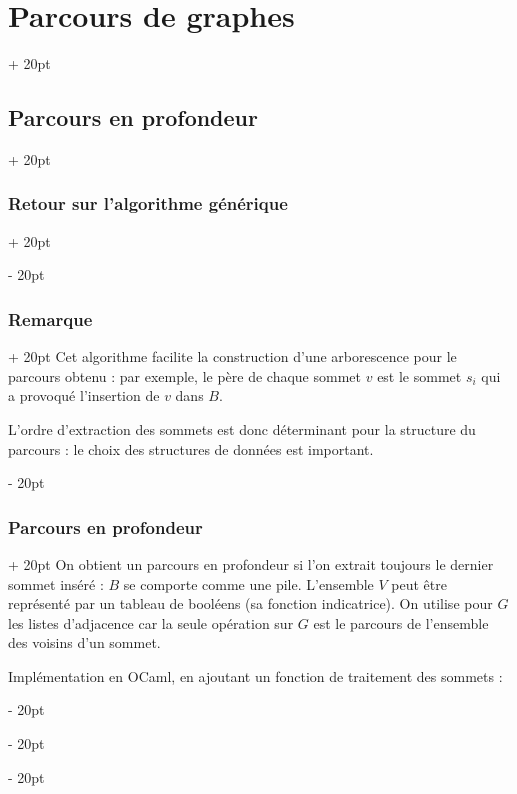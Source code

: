 \documentclass[a4paper, 12pt, twoside]{article}
\newcommand{\ind}[1][20pt]{\advance\leftskip + #1}
\newcommand{\deind}[1][20pt]{\advance\leftskip - #1}
\newenvironment{indt}[2][20pt]{#2 \par \ind[#1]}{\par \deind} %
\begin{document}
\begin{indt}{\section{Parcours de graphes}}
\begin{indt}{\subsection{Parcours en profondeur}}
\begin{indt}{\subsubsection{Retour sur l'algorithme générique}}
\begin{center}
                \end{center}
            \end{indt}

            \vspace{12pt}
            
            \begin{indt}{\subsubsection{Remarque}}
                Cet algorithme facilite la construction d'une arborescence pour le parcours obtenu : par exemple, le père de chaque sommet $v$ est le sommet $s_i$ qui a provoqué l'insertion de $v$ dans $B$.

                L'ordre d'extraction des sommets est donc déterminant pour la structure du parcours : le choix des structures de données est important.
            \end{indt}

            \vspace{12pt}
            
            \begin{indt}{\subsubsection{Parcours en profondeur}}
                On obtient un parcours en profondeur si l'on extrait toujours le dernier sommet inséré : $B$ se comporte comme une pile.
                L'ensemble $V$ peut être représenté par un tableau de booléens (sa fonction indicatrice).
                On utilise pour $G$ les listes d'adjacence car la seule opération sur $G$ est le parcours de l'ensemble des voisins d'un sommet.

                \vspace{12pt}
                
                Implémentation en OCaml, en ajoutant un fonction de traitement des sommets :


\end{indt}
\end{indt}
\end{indt}
\end{document}
